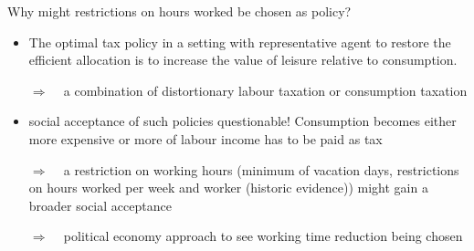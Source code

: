 \documentclass[11pt,aspectratio=169]{beamer}
\newcommand{\ar}{$\Rightarrow$ \ }
\begin{document}
\appendix
\begin{frame}{Why might restrictions on hours worked be chosen as policy?}
	\begin{itemize}
		\item \cite{Alvarez-Cuadrado2007EnvyHours}
		The optimal tax policy in a setting with representative agent to restore the efficient allocation is to increase the value of leisure relative to consumption.
		\item[\ar] a combination of distortionary labour taxation or consumption taxation
		\item social acceptance of such policies questionable! Consumption becomes either more expensive or more of labour income has to be paid as tax
		\item[\ar] a restriction on working hours (minimum of vacation days, restrictions on hours worked per week and worker (historic evidence)) might gain a broader social acceptance
		\item[\ar] political economy approach to see working time reduction being chosen
	\end{itemize}
\end{frame}
\end{document}
